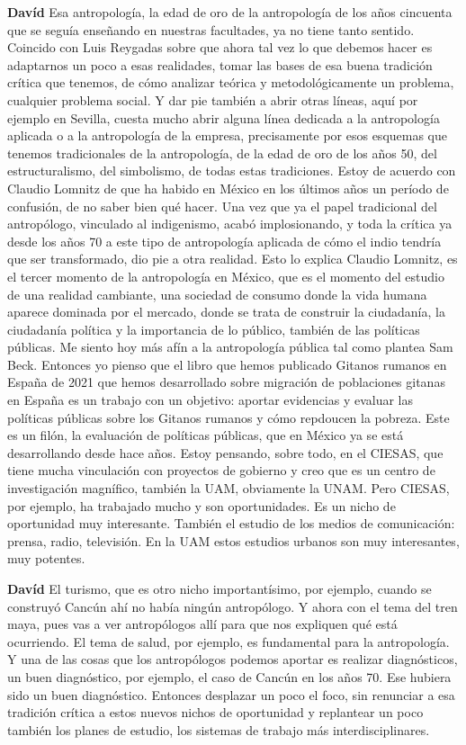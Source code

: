 \documentclass[
  spanish,
  11pt,
  a4paper,
]{scrbook}
\newenvironment{transcripcion}{
    \begin{list}{}{
        \setlength{\leftmargin}{1.5em}  %
        \setlength{\rightmargin}{0em}
        \setlength{\itemsep}{0.2em}     %
        \setlength{\parsep}{0.0em}
        \setlength{\listparindent}{0pt}
    }
}{
    \end{list}
}
\newcommand{\personaje}[1]{\textbf{#1}\quad}
\begin{document}
\begin{transcripcion}
\item \personaje{Davíd} Esa antropología, la edad de oro de la antropología de los años cincuenta que se seguía enseñando en nuestras facultades, ya no tiene tanto sentido. Coincido con Luis Reygadas sobre que ahora tal vez lo que debemos hacer es adaptarnos un poco a esas realidades, tomar las bases de esa buena tradición crítica que tenemos, de cómo analizar teórica y metodológicamente un problema, cualquier problema social. Y dar pie también a abrir otras líneas, aquí por ejemplo en Sevilla, cuesta mucho abrir alguna línea dedicada a la antropología aplicada o a la antropología de la empresa, precisamente por esos esquemas que tenemos tradicionales de la antropología, de la edad de oro de los años 50, del estructuralismo, del simbolismo, de todas estas tradiciones. Estoy de acuerdo con Claudio Lomnitz de que ha habido en México en los últimos años un período de confusión, de no saber bien qué hacer. Una vez que ya el papel tradicional del antropólogo, vinculado al indigenismo, acabó implosionando, y toda la crítica ya desde los años 70 a este tipo de antropología aplicada de cómo el indio tendría que ser transformado, dio pie a otra realidad. Esto lo explica Claudio Lomnitz, es el tercer momento de la antropología en México, que es el momento del estudio de una realidad cambiante, una sociedad de consumo donde la vida humana aparece dominada por el mercado, donde se trata de construir la ciudadanía, la ciudadanía política y la importancia de lo público, también de las políticas públicas. Me siento hoy más afín a la antropología pública tal como plantea Sam Beck. Entonces yo pienso que el libro que hemos publicado Gitanos rumanos en España de 2021 que hemos desarrollado sobre migración de poblaciones gitanas en España es un trabajo con un objetivo: aportar evidencias y evaluar las políticas públicas sobre los Gitanos rumanos y cómo repdoucen la pobreza. Este es un filón, la evaluación de políticas públicas, que en México ya se está desarrollando desde hace años. Estoy pensando, sobre todo, en el CIESAS, que tiene mucha vinculación con proyectos de gobierno y creo que es un centro de investigación magnífico, también la UAM, obviamente la UNAM. Pero CIESAS, por ejemplo, ha trabajado mucho y son oportunidades. Es un nicho de oportunidad muy interesante. También el estudio de los medios de comunicación: prensa, radio, televisión. En la UAM estos estudios urbanos son muy interesantes, muy potentes.

\item \personaje{Davíd} El turismo, que es otro nicho importantísimo, por ejemplo, cuando se construyó Cancún ahí no había ningún antropólogo. Y ahora con el tema del tren maya, pues vas a ver antropólogos allí para que nos expliquen qué está ocurriendo. El tema de salud, por ejemplo, es fundamental para la antropología. Y una de las cosas que los antropólogos podemos aportar es realizar diagnósticos, un buen diagnóstico, por ejemplo, el caso de Cancún en los años 70. Ese hubiera sido un buen diagnóstico. Entonces desplazar un poco el foco, sin renunciar a esa tradición crítica a estos nuevos nichos de oportunidad y replantear un poco también los planes de estudio, los sistemas de trabajo más interdisciplinares.


\end{transcripcion}
\end{document}

